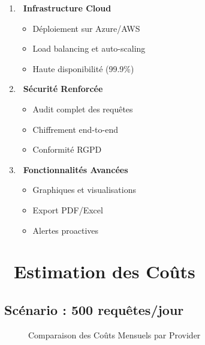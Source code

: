 \documentclass[12pt,a4paper]{article}
\begin{document}
\begin{enumerate}[leftmargin=*]
    \item \textbf{\faCloud\ Infrastructure Cloud}
    \begin{itemize}
        \item Déploiement sur Azure/AWS
        \item Load balancing et auto-scaling
        \item Haute disponibilité (99.9\%)
    \end{itemize}
    
    \item \textbf{\faShieldAlt\ Sécurité Renforcée}
    \begin{itemize}
        \item Audit complet des requêtes
        \item Chiffrement end-to-end
        \item Conformité RGPD
    \end{itemize}
    
    \item \textbf{\faChartArea\ Fonctionnalités Avancées}
    \begin{itemize}
        \item Graphiques et visualisations
        \item Export PDF/Excel
        \item Alertes proactives
    \end{itemize}
\end{enumerate}

\newpage

\section{\faEuroSign\ Estimation des Coûts}

\subsection{Scénario : 500 requêtes/jour}

\begin{figure}[H]
\centering
{}
\caption{Comparaison des Coûts Mensuels par Provider}
\end{figure}
\end{document}
